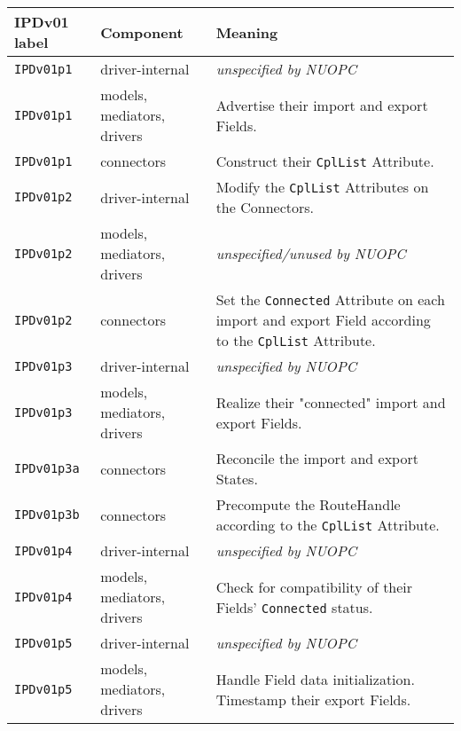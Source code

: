 \vspace*{3ex}
\begin{longtable}[h]{|p{}|p{}|p{}|}
     \hline\hline
     {\bf IPDv01 label} & {\bf Component} & {\bf Meaning}\\
     \hline\hline
     {\tt IPDv01p1} & driver-internal             & {\em unspecified by NUOPC}\\ \hline
     {\tt IPDv01p1} & models, mediators, drivers  & Advertise their import and export Fields.\\ \hline
     {\tt IPDv01p1} & connectors                  & Construct their {\tt CplList} Attribute.\\ \hline
     {\tt IPDv01p2} & driver-internal             & Modify the {\tt CplList} Attributes on the Connectors.\\ \hline
     {\tt IPDv01p2} & models, mediators, drivers  & {\em unspecified/unused by NUOPC}\\ \hline
     {\tt IPDv01p2} & connectors                  & Set the {\tt Connected} Attribute on each import and export Field according to the {\tt CplList} Attribute.\\ \hline
     {\tt IPDv01p3} & driver-internal             & {\em unspecified by NUOPC}\\ \hline
     {\tt IPDv01p3} & models, mediators, drivers  & Realize their "connected" import and export Fields.\\ \hline
     {\tt IPDv01p3a}& connectors                  & Reconcile the import and export States.\\ \hline
     {\tt IPDv01p3b}& connectors                  & Precompute the RouteHandle according to the {\tt CplList} Attribute.\\ \hline
     {\tt IPDv01p4} & driver-internal             & {\em unspecified by NUOPC}\\ \hline
     {\tt IPDv01p4} & models, mediators, drivers  & Check for compatibility of their Fields' {\tt Connected} status.\\ \hline
     {\tt IPDv01p5} & driver-internal             & {\em unspecified by NUOPC}\\ \hline
     {\tt IPDv01p5} & models, mediators, drivers  & Handle Field data initialization. Timestamp their export Fields.\\
     \hline\hline
\end{longtable}

